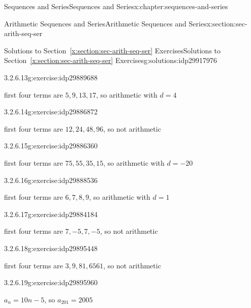 \documentclass[twoside,10pt,]{book}
\newcommand{\xreffont}{\relax}
\numberwithin{equation}{section}
\begin{document}
\begin{chapterptx}{Sequences and Series}{}{Sequences and Series}{}{}{x:chapter:sequences-and-series}
\begin{sectionptx}{Arithmetic Sequences and Series}{}{Arithmetic Sequences and Series}{}{}{x:section:sec-arith-seq-ser}
\begin{solutions-subsection}{Solutions to Section~{\xreffont\ref*{x:section:sec-arith-seq-ser}} Exercises}{}{Solutions to Section~{\xreffont\ref*{x:section:sec-arith-seq-ser}} Exercises}{}{}{g:solutions:idp29917976}
\par\medskip\noindent
\begin{exercisegroup}
\begin{divisionsolutioneg}{3.2.6.13}{}{g:exercise:idp29889688}%
\par\smallskip%
\noindent\hypertarget{g:solution:idp29886232-main}{}first four terms are \(5, 9, 13, 17\), so arithmetic with \(d = 4\)\end{divisionsolutioneg}%
\begin{divisionsolutioneg}{3.2.6.14}{}{g:exercise:idp29886872}%
\par\smallskip%
\noindent\hypertarget{g:solution:idp29890072-main}{}first four terms are \(12, 24, 48, 96\), so not arithmetic\end{divisionsolutioneg}%
\begin{divisionsolutioneg}{3.2.6.15}{}{g:exercise:idp29886360}%
\par\smallskip%
\noindent\hypertarget{g:solution:idp29885336-main}{}first four terms are \(75, 55, 35, 15\), so arithmetic with \(d = -20\)\end{divisionsolutioneg}%
\begin{divisionsolutioneg}{3.2.6.16}{}{g:exercise:idp29888536}%
\par\smallskip%
\noindent\hypertarget{g:solution:idp29885080-main}{}first four terms are \(6, 7, 8, 9\), so arithmetic with \(d = 1\)\end{divisionsolutioneg}%
\begin{divisionsolutioneg}{3.2.6.17}{}{g:exercise:idp29884184}%
\par\smallskip%
\noindent\hypertarget{g:solution:idp29890968-main}{}first four terms are \(7, -5, 7, -5\), so not arithmetic\end{divisionsolutioneg}%
\begin{divisionsolutioneg}{3.2.6.18}{}{g:exercise:idp29895448}%
\par\smallskip%
\noindent\hypertarget{g:solution:idp29891864-main}{}first four terms are \(3, 9, 81, 6561\), so not arithmetic\end{divisionsolutioneg}%
\end{exercisegroup}
\par\medskip\noindent
\begin{divisionsolution}{3.2.6.19}{}{g:exercise:idp29895960}%
\par\smallskip%
\noindent\hypertarget{g:solution:idp29895320-main}{}\(a_n = 10n - 5\), so \(a_{201} = 2005\)\end{divisionsolution}%

\end{solutions-subsection}
\end{sectionptx}
\end{chapterptx}
\end{document}
